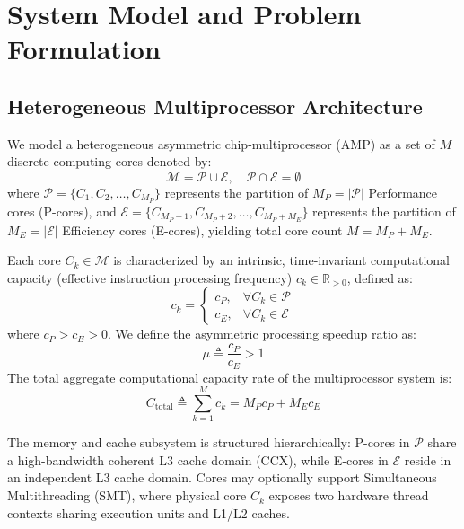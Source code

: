 \documentclass[conference]{IEEEtran}
\begin{document}
\section{System Model and Problem Formulation}
\label{sec:system_model}

\subsection{Heterogeneous Multiprocessor Architecture}
We model a heterogeneous asymmetric chip-multiprocessor (AMP) as a set of $M$ discrete computing cores denoted by:
\begin{equation}
\mathcal{M} = \mathcal{P} \cup \mathcal{E}, \quad \mathcal{P} \cap \mathcal{E} = \emptyset
\end{equation}
where $\mathcal{P} = \{C_1, C_2, \dots, C_{M_P}\}$ represents the partition of $M_P = |\mathcal{P}|$ Performance cores (P-cores), and $\mathcal{E} = \{C_{M_P+1}, C_{M_P+2}, \dots, C_{M_P+M_E}\}$ represents the partition of $M_E = |\mathcal{E}|$ Efficiency cores (E-cores), yielding total core count $M = M_P + M_E$.

Each core $C_k \in \mathcal{M}$ is characterized by an intrinsic, time-invariant computational capacity (effective instruction processing frequency) $c_k \in \mathbb{R}_{> 0}$, defined as:
\begin{equation}
c_k = \begin{cases} 
c_P, & \forall C_k \in \mathcal{P} \\ 
c_E, & \forall C_k \in \mathcal{E} 
\end{cases}
\end{equation}
where $c_P > c_E > 0$. We define the asymmetric processing speedup ratio as:
\begin{equation}
\mu \triangleq \frac{c_P}{c_E} > 1
\end{equation}
The total aggregate computational capacity rate of the multiprocessor system is:
\begin{equation}
C_{\mathrm{total}} \triangleq \sum_{k=1}^M c_k = M_P c_P + M_E c_E
\end{equation}

The memory and cache subsystem is structured hierarchically: P-cores in $\mathcal{P}$ share a high-bandwidth coherent L3 cache domain (CCX), while E-cores in $\mathcal{E}$ reside in an independent L3 cache domain. Cores may optionally support Simultaneous Multithreading (SMT), where physical core $C_k$ exposes two hardware thread contexts sharing execution units and L1/L2 caches.
\end{document}
